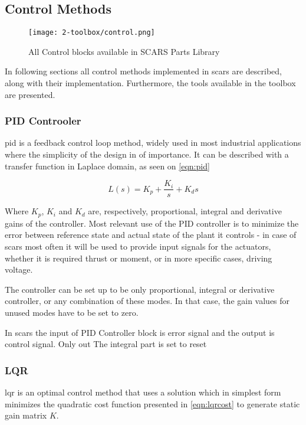 \subsection{Control Methods}\label{sec:control}
    \begin{figure}[H]
        \centering
        \texttt{[image: 2-toolbox/control.png]}
        \caption{All Control blocks available in SCARS Parts Library}
        \label{fig:control}
    \end{figure}
    In following sections all control methods implemented in \ac{scars} are described, along with their implementation. Furthermore, the tools available in the toolbox are presented. 
    
    \subsubsection{PID Controoler}

        \ac{pid} is a feedback control loop method, widely used in most industrial applications where the simplicity of the design in of importance. It can be described with a transfer function in Laplace domain, as seen on \autoref{eqn:pid}
        
        \begin{equation}
            L(s) = K_p + \frac{K_i}{s} + K_d s
        \end{equation}\label{eqn:pid}

        Where $K_p$, $K_i$ and $K_d$ are, respectively, proportional, integral and derivative gains of the controller. Most relevant use of the PID controller is to minimize the error between reference state and actual state of the plant it controls - in case of \ac{scars} most often it will be used to provide input signals for the actuators, whether it is required thrust or moment, or in more specific cases, driving voltage.

        The controller can be set up to be only proportional, integral or derivative controller, or any combination of these modes. In that case, the gain values for unused modes have to be set to zero.

        In \ac{scars} the input of PID Controller block is error signal and the output is control signal. Only out The integral part is set to reset  
    
    \subsubsection{LQR}\label{sec:lqr}
        \ac{lqr} is an optimal control method that uses a solution which in simplest form minimizes the quadratic cost function presented in \autoref{eqn:lqrcost} to generate static gain matrix $K$.

